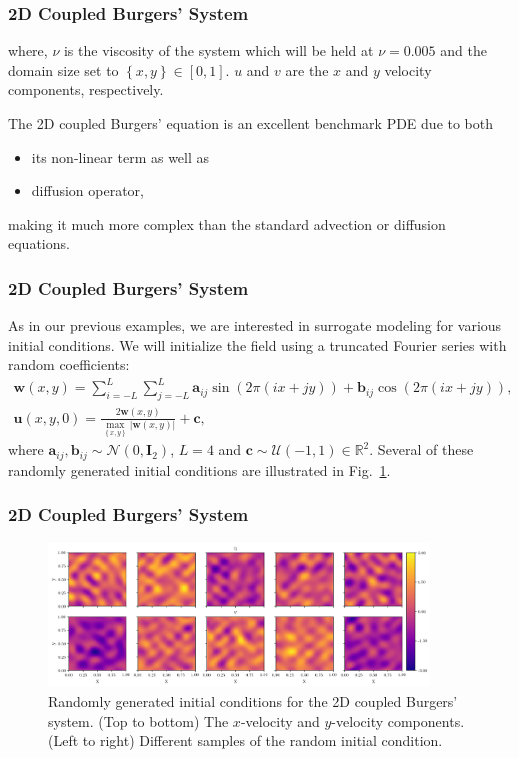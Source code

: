 \documentclass{beamer}
\theoremstyle{remark}
\newcommand{\viscosity}{\nu}
\newcommand{\mc}{\mathcal}
\begin{document}
\begin{frame}
\frametitle{2D Coupled Burgers' System}
where,
 $\viscosity$ is the viscosity of the system which will be held at $\nu=0.005$ and the domain size set to $\left\{x,y \right\} \in [0,1]$.
$u$ and $v$ are the $x$ and $y$ velocity components, respectively.

The 2D coupled Burgers' equation is an excellent benchmark PDE due to both
\begin{itemize}
\item{its non-linear term as well as}
\item{diffusion operator,}
\end{itemize} 
making it much more complex than the standard advection or diffusion equations.

\end{frame}


\begin{frame}
\frametitle{2D Coupled Burgers' System}
As in our previous examples, we are interested in surrogate modeling for various initial conditions.
We will initialize the field using a truncated Fourier series with random coefficients:
\begin{equation}
    \begin{gathered}
        \bm{w}(x,y) = \sum_{i=-L}^L \sum_{j=-L}^L \bm{a}_{ij} \sin(2\pi\left(ix + jy\right)) + \bm{b}_{ij} \cos(2\pi\left(ix + jy\right)), \\
        \bm{u}(x, y, 0) = \frac{2\bm{w}(x,y)}{\max_{\left\{x,y\right\}} |\bm{w}(x,y)|} + \bm{c},
    \end{gathered}
    \label{eq:burger2d-initial}
\end{equation}
where $\bm{a}_{ij}, \bm{b}_{ij} \sim \mc N(0, \bm{I}_{2})$, $L=4$ and $\bm{c}\sim \mc U(-1, 1) \in \mathbb{R}^{2}$.
Several of these randomly generated initial conditions are illustrated in Fig.~\ref{fig:burgers2D-Initial}.
\end{frame}


\begin{frame}
\frametitle{2D Coupled Burgers' System}
\begin{figure}[H]
    \centering
    \includegraphics[width=0.9\textwidth]{Fig16.png}
    \caption{Randomly generated initial conditions for the 2D coupled Burgers' system. (Top to bottom) The $x$-velocity and $y$-velocity components. (Left to right) Different samples of the random initial condition.}
    \label{fig:burgers2D-Initial}
\end{figure}
\end{frame}
\end{document}
